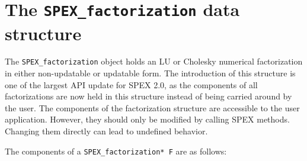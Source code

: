 \documentclass[12pt]{report}
\theoremstyle{definition}
\begin{document}
\section{The \texttt{SPEX\_factorization} data structure}

The \verb|SPEX_factorization| object holds an LU or Cholesky numerical factorization in either non-updatable or updatable form. The introduction of this structure is one of the largest API update for SPEX 2.0, as the components of all factorizations are now held in this structure instead of being carried around by the user. The components of the factorization structure are accessible to the user application. However, they should only be modified by calling SPEX methods.  Changing them directly can lead to undefined behavior.

The components of a \verb|SPEX_factorization* F| are as follows:
\end{document}
